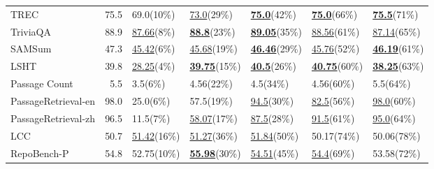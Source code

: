\begin{tabular}{lrlllll}
TREC & 75.5 & 69.0(10\%) & \underline{73.0}(29\%) & \underline{\textbf{75.0}}(42\%) & \underline{\textbf{75.0}}(66\%) & \underline{\textbf{75.5}}(71\%) \\
TriviaQA & 88.9 & \underline{87.66}(8\%) & \underline{\textbf{88.8}}(23\%) & \underline{\textbf{89.05}}(35\%) & \underline{88.56}(61\%) & \underline{87.14}(65\%) \\
SAMSum & 47.3 & \underline{45.42}(6\%) & \underline{45.68}(19\%) & \underline{\textbf{46.46}}(29\%) & \underline{45.76}(52\%) & \underline{\textbf{46.19}}(61\%) \\
LSHT & 39.8 & \underline{28.25}(4\%) & \underline{\textbf{39.75}}(15\%) & \underline{\textbf{40.5}}(26\%) & \underline{\textbf{40.75}}(60\%) & \underline{\textbf{38.25}}(63\%) \\
Passage Count & 5.5 & 3.5(6\%) & 4.56(22\%) & 4.5(34\%) & 4.56(60\%) & 5.5(64\%) \\
PassageRetrieval-en & 98.0 & 25.0(6\%) & 57.5(19\%) & \underline{94.5}(30\%) & \underline{82.5}(56\%) & \underline{98.0}(60\%) \\
PassageRetrieval-zh & 96.5 & 11.5(7\%) & \underline{58.07}(17\%) & \underline{87.5}(28\%) & \underline{91.5}(61\%) & \underline{95.0}(64\%) \\
LCC & 50.7 & \underline{51.42}(16\%) & \underline{51.27}(36\%) & \underline{51.84}(50\%) & 50.17(74\%) & 50.06(78\%) \\
RepoBench-P & 54.8 & 52.75(10\%) & \underline{\textbf{55.98}}(30\%) & \underline{54.51}(45\%) & \underline{54.4}(69\%) & 53.58(72\%) \\
\bottomrule
\end{tabular}
